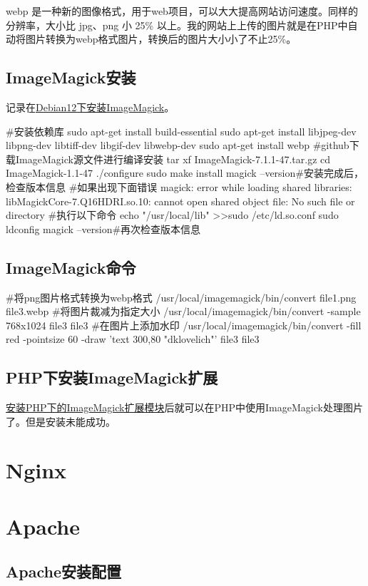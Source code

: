 webp 是一种新的图像格式，用于web项目，可以大大提高网站访问速度。同样的分辨率，大小比 jpg、png 小 25\% 以上。我的网站上上传的图片就是在PHP中自动将图片转换为webp格式图片，转换后的图片大小小了不止25\%。
\subsection{ImageMagick安装}
记录在\href{https://blog.csdn.net/Wufjsjjx/article/details/135401894?spm=1001.2014.3001.5506}{Debian12下安装ImageMagick}。
\begin{shell}
#安装依赖库
sudo apt-get install build-essential 
sudo apt-get install libjpeg-dev libpng-dev libtiff-dev libgif-dev libwebp-dev 
sudo apt-get install webp
#github下载ImageMagick源文件进行编译安装
tar xf ImageMagick-7.1.1-47.tar.gz
cd ImageMagick-1.1-47
./configure
sudo make install
magick --version#安装完成后，检查版本信息
#如果出现下面错误
magick: error while loading shared libraries: libMagickCore-7.Q16HDRI.so.10: cannot open shared object file: No such file or directory 
#执行以下命令
echo "/usr/local/lib" >>sudo  /etc/ld.so.conf
sudo ldconfig
magick --version#再次检查版本信息
\end{shell}
\subsection{ImageMagick命令}
\begin{shell}
#将png图片格式转换为webp格式
/usr/local/imagemagick/bin/convert file1.png file3.webp
#将图片裁减为指定大小
/usr/local/imagemagick/bin/convert -sample 768x1024 file3 file3
#在图片上添加水印
/usr/local/imagemagick/bin/convert -fill red -pointsize 60 -draw 'text 300,80 "dklovelich"' file3 file3
\end{shell}
\subsection{PHP下安装ImageMagick扩展}
\href{https://blog.csdn.net/JineD/article/details/108318106?spm=1001.2014.3001.5506}{安装PHP下的ImageMagick扩展模块}后就可以在PHP中使用ImageMagick处理图片了。但是安装未能成功。

\section{Nginx}
\section{Apache}
\subsection{Apache安装配置}
